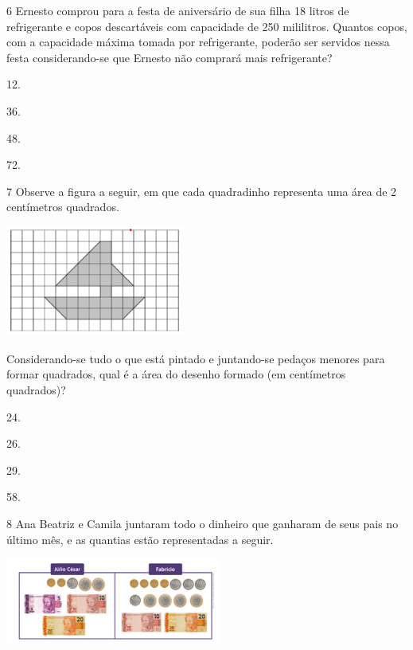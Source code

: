 \begin{mdframed}[linewidth=2pt,linecolor=salmao,roundcorner=2pt]
\begin{escolha}
{\begin{escolha}
\num{6} Ernesto comprou para a festa de aniversário de sua filha 18 litros de
refrigerante e copos descartáveis com capacidade de 250 mililitros.
Quantos copos, com a capacidade máxima tomada por refrigerante, poderão
ser servidos nessa festa considerando-se que Ernesto não comprará mais
refrigerante?

\begin{escolha}
\item
  12.
\item
  36.
\item
  48.
\item
  72.
\end{escolha}


\num{7} Observe a figura a seguir, em que cada quadradinho representa uma área de 2 centímetros quadrados.

\includegraphics[width=2.32692in,height=1.43990in]{media/image144.png}

Considerando-se tudo o que está pintado e juntando-se pedaços
menores para formar quadrados, qual é a área do desenho formado (em centímetros quadrados)?

\begin{escolha}
\item
  24.
\item
  26.
\item
  29.
\item
  58.
\end{escolha}


\num{8} Ana Beatriz e Camila juntaram todo o dinheiro que ganharam de seus pais no
último mês, e as quantias estão representadas a seguir.


\includegraphics[width=2.77564in,height=1.11703in]{media/image145.png}


\end{escolha}}
\end{escolha}
\end{mdframed}
